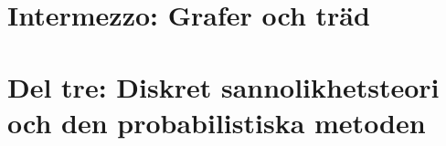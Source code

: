 \documentclass[nobib]{tufte-handout}
\begin{document}
\section{Intermezzo: Grafer och träd}

\section{Del tre: Diskret sannolikhetsteori och den probabilistiska metoden}

%
%
\end{document}
